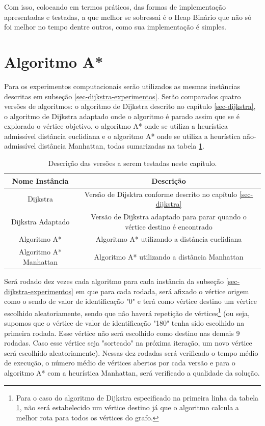 Com isso, colocando em termos práticos, das formas de implementação apresentadas e testadas, a que melhor se sobressai é o Heap Binário que não só foi melhor no tempo dentre outros, como sua implementação é simples.

\section{Algoritmo A*}
\label{sec-aestrela-experimentos}

Para os experimentos computacionais serão utilizados as mesmas instâncias descritas em subseção \ref{sec-dijkstra-experimentos}. Serão comparados quatro versões de algoritmos: o algoritmo de Dijkstra descrito no capítulo \ref{sec-dijkstra}, o algoritmo de Dijkstra adaptado onde o algoritmo é parado assim que se é explorado o vértice objetivo, o algoritmo A* onde se utiliza a heurística admissível distância euclidiana e o algoritmo A* onde se utiliza a heurística não-admissível distância Manhattan, todas sumarizadas na tabela \ref{tbl-aestrela-instancias}.

\begin{table}[H]
\caption{Descrição das versões a serem testadas neste capítulo.}
\label{tbl-aestrela-instancias}
\centering
\begin{adjustbox}{max width=\textwidth}
\begin{tabular}{|c|c|}
\hline 
\textbf{Nome Instância} & \textbf{Descrição} \\ 
\hline 
Dijkstra & Versão de Dijsktra conforme descrito no capítulo \ref{sec-dijkstra} \\ 
\hline 
Dijkstra Adaptado & Versão de Dijkstra adaptado para parar quando o vértice destino é encontrado \\ 
\hline 
Algoritmo A* & Algoritmo A* utilizando a distância euclidiana \\ 
\hline 
Algoritmo A* Manhattan & Algoritmo A* utilizando a distância Manhattan \\ 
\hline 
\end{tabular} 
\end{adjustbox}
\end{table}

Será rodado dez vezes cada algoritmo para cada instância da subseção \ref{sec-dijkstra-experimentos} em que para cada rodada, será afixado o vértice origem como o sendo de valor de identificação "0" e terá como vértice destino um vértice escolhido aleatoriamente, sendo que não haverá repetição de vértices\footnote{Para o caso do algoritmo de Dijkstra especificado na primeira linha da tabela \ref{tbl-aestrela-instancias}, não será estabelecido um vértice destino já que o algoritmo calcula a melhor rota para todos os vértices do grafo.} (ou seja, supomos que o vértice de valor de identificação "180" tenha sido escolhido na primeira rodada. Esse vértice não será escolhido como destino nas demais 9 rodadas. Caso esse vértice seja "sorteado" na próxima iteração, um novo vértice será escolhido aleatoriamente). Nessas dez rodadas será verificado o tempo médio de execução, o número médio de vértices abertos por cada versão e para o algoritmo A* com a heurística Manhattan, será verificado a qualidade da solução.

